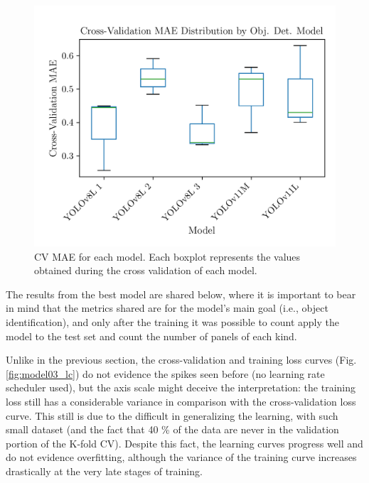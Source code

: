 \documentclass[conference]{IEEEtran}
\begin{document}
\begin{figure}[H]
    \centering
    \includegraphics[width=1\linewidth]{assets/model03_mae_boxplot.png}
    \caption{CV MAE for each model. Each boxplot represents the values obtained during the cross validation of each model.}
    \label{fig:model03_mae_boxplot}
\end{figure}

The results from the best model are shared below, where it is important to bear in mind that the metrics shared are for the model's main goal (i.e., object identification), and only after the training it was possible to count apply the model to the test set and count the number of panels of each kind.

Unlike in the previous section, the cross-validation and training loss curves (Fig. \ref{fig:model03_lc}) do not evidence the spikes seen before (no learning rate scheduler used), but the axis scale might deceive the interpretation: the training loss still has a considerable variance in comparison with the cross-validation loss curve. This still is due to the difficult in generalizing the learning, with such small dataset (and the fact that 40 \% of the data are never in the validation portion of the K-fold CV). Despite this fact, the learning curves progress well and do not evidence overfitting, although the variance of the training curve increases drastically at the very late stages of training.
\end{document}
